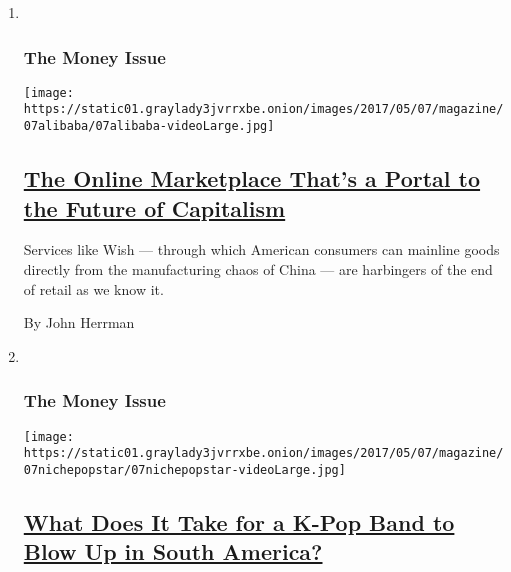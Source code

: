 \begin{enumerate}
\def\labelenumi{\arabic{enumi}.}
\item ~
  \hypertarget{the-money-issue-5}{%
  \subsubsection{The Money Issue}\label{the-money-issue-5}}

  \texttt{[image: https://static01.graylady3jvrrxbe.onion/images/2017/05/07/magazine/07alibaba/07alibaba-videoLarge.jpg]}

  \hypertarget{the-online-marketplace-thats-a-portal-to-the-future-of-capitalism}{%
  \subsection{\texorpdfstring{\href{/2017/05/03/magazine/the-online-marketplace-thats-a-portal-to-the-future-of-capitalism.html}{The
  Online Marketplace That's a Portal to the Future of
  Capitalism}}{The Online Marketplace That's a Portal to the Future of Capitalism}}\label{the-online-marketplace-thats-a-portal-to-the-future-of-capitalism}}

  Services like Wish --- through which American consumers can mainline
  goods directly from the manufacturing chaos of China --- are
  harbingers of the end of retail as we know it.

  By John Herrman
\item ~
  \hypertarget{the-money-issue-6}{%
  \subsubsection{The Money Issue}\label{the-money-issue-6}}

  \texttt{[image: https://static01.graylady3jvrrxbe.onion/images/2017/05/07/magazine/07nichepopstar/07nichepopstar-videoLarge.jpg]}

  \hypertarget{what-does-it-take-for-a-k-pop-band-to-blow-up-in-south-america}{%
  \subsection{\texorpdfstring{\href{/2017/05/04/magazine/what-does-it-take-for-a-k-pop-band-to-blow-up-in-south-america.html}{What
  Does It Take for a K-Pop Band to Blow Up in South
  America?}}{What Does It Take for a K-Pop Band to Blow Up in South America?}}\label{what-does-it-take-for-a-k-pop-band-to-blow-up-in-south-america}}


\end{enumerate}
